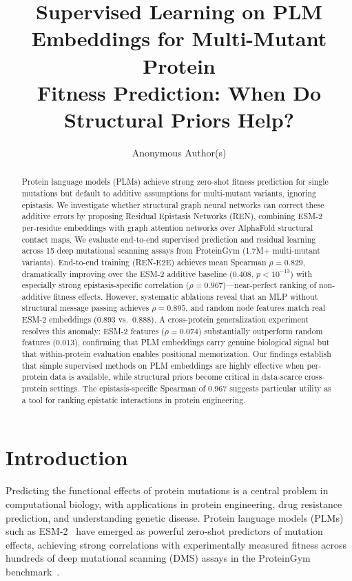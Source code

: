 \documentclass{article}
\title{Supervised Learning on PLM Embeddings for Multi-Mutant Protein\\Fitness Prediction: When Do Structural Priors Help?}
\author{
  Anonymous Author(s)
}
\newcommand{\ren}{\textsc{REN}}
\newcommand{\rene}{\textsc{REN-E2E}}
\begin{document}
\maketitle

\begin{abstract}
Protein language models (PLMs) achieve strong zero-shot fitness prediction for single mutations but default to additive assumptions for multi-mutant variants, ignoring epistasis. We investigate whether structural graph neural networks can correct these additive errors by proposing Residual Epistasis Networks (\ren{}), combining ESM-2 per-residue embeddings with graph attention networks over AlphaFold structural contact maps. We evaluate end-to-end supervised prediction and residual learning across 15 deep mutational scanning assays from ProteinGym (1.7M+ multi-mutant variants). End-to-end training (\rene{}) achieves mean Spearman $\rho = 0.829$, dramatically improving over the ESM-2 additive baseline ($0.408$, $p < 10^{-13}$) with especially strong epistasis-specific correlation ($\rho = 0.967$)---near-perfect ranking of non-additive fitness effects. However, systematic ablations reveal that an MLP without structural message passing achieves $\rho = 0.895$, and random node features match real ESM-2 embeddings ($0.893$ vs.\ $0.888$). A cross-protein generalization experiment resolves this anomaly: ESM-2 features ($\rho = 0.074$) substantially outperform random features ($0.013$), confirming that PLM embeddings carry genuine biological signal but that within-protein evaluation enables positional memorization. Our findings establish that simple supervised methods on PLM embeddings are highly effective when per-protein data is available, while structural priors become critical in data-scarce cross-protein settings. The epistasis-specific Spearman of $0.967$ suggests particular utility as a tool for ranking epistatic interactions in protein engineering.
\end{abstract}

\section{Introduction}

Predicting the functional effects of protein mutations is a central problem in computational biology, with applications in protein engineering, drug resistance prediction, and understanding genetic disease. Protein language models (PLMs) such as ESM-2~\citep{lin2023evolutionary} have emerged as powerful zero-shot predictors of mutation effects, achieving strong correlations with experimentally measured fitness across hundreds of deep mutational scanning (DMS) assays in the ProteinGym benchmark~\citep{notin2024proteingym}.
\end{document}
